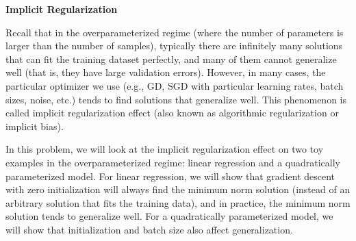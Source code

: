 \item {\bf Implicit Regularization}

Recall that in the overparameterized regime (where the number of parameters is larger than the number of samples), typically there are infinitely many solutions that can fit the training dataset perfectly, and many of them cannot generalize well (that is, they have large validation errors). However, in many cases, the particular optimizer we use (e.g., GD, SGD with particular learning rates, batch sizes, noise, etc.) tends to find solutions that generalize well. This phenomenon is called implicit regularization effect (also known as algorithmic regularization or implicit bias). 

In this problem, we will look at the implicit regularization effect on two toy examples in the overparameterized regime: linear regression and a quadratically parameterized model. For linear regression, we will show that gradient descent with zero initialization will always find the minimum norm solution (instead of an arbitrary solution that fits the training data), and in practice, the minimum norm solution tends to generalize well. For a quadratically parameterized model, we will show that initialization and batch size also affect generalization.

\begin{enumerate}
    
    
    
    
    
	
	

	

	

	

	

	
\end{enumerate}
